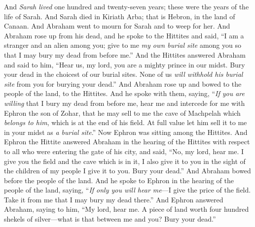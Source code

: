 \begin{biblechapter} %
 And \textit{Sarah lived} one hundred and twenty-seven years; these were the years of the life of Sarah.
\verse And Sarah died in Kiriath Arba; that is Hebron, in the land of Canaan.
\verse And Abraham went to mourn for Sarah and to weep for her. And Abraham rose up from his dead, and he spoke to the Hittites and said,
\verse “I am a stranger and an alien among you; give to me \textit{my own burial site} among you so that I may bury my dead from before me.”
\verse And the Hittites answered Abraham and said to him,
\verse “Hear us, my lord, you are a mighty prince in our midst. Bury your dead in the choicest of our burial sites. None of us \textit{will withhold his burial site} from you for burying your dead.”
\verse And Abraham rose up and bowed to the people of the land, to the Hittites.
\verse And he spoke with them, saying, “\textit{If you are willing} that I bury my dead from before me, hear me and intercede for me with Ephron the son of Zohar,
\verse that he may sell to me the cave of Machpelah which \textit{belongs to him}, which is at the end of his field. At full value let him sell it to me in your midst as \textit{a burial site}.”
\verse Now Ephron was sitting among the Hittites. And Ephron the Hittite answered Abraham in the hearing of the Hittites with respect to all who were entering the gate of his city, and said,
\verse “No, my lord, hear me. I give you the field and the cave which is in it, I also give it to you in the sight of the children of my people I give it to you. Bury your dead.”
\verse And Abraham bowed before the people of the land.
\verse And he spoke to Ephron in the hearing of the people of the land, saying, “\textit{If only you will hear me}—I give the price of the field. Take it from me that I may bury my dead there.”
\verse And Ephron answered Abraham, saying to him,
\verse “My lord, hear me. A piece of land worth four hundred shekels of silver—what is that between me and you? Bury your dead.”

\end{biblechapter}

